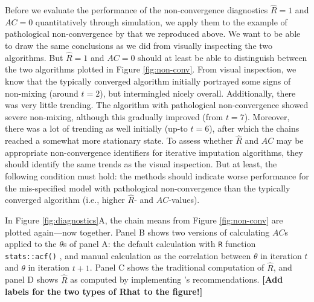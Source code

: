 \documentclass[Royal,times,sageh]{sagej}
\begin{document}
Before we evaluate the performance of the non-convergence diagnostics \(\widehat{R}=1\) and \(AC=0\) quantitatively through simulation, we apply them to the example of pathological non-convergence by \citet{buur18} that we reproduced above. We want to be able to draw the same conclusions as we did from visually inspecting the two algorithms. But \(\widehat{R}=1\) and \(AC=0\) should at least be able to distinguish between the two algorithms plotted in Figure \ref{fig:non-conv}. From visual inspection, we know that the typically converged algorithm initially portrayed some signs of non-mixing (around \(t=2\)), but intermingled nicely overall. Additionally, there was very little trending. The algorithm with pathological non-convergence showed severe non-mixing, although this gradually improved (from \(t=7\)). Moreover, there was a lot of trending as well initially (up-to \(t=6\)), after which the chains reached a somewhat more stationary state. To assess whether \(\widehat{R}\) and \(AC\) may be appropriate non-convergence identifiers for iterative imputation algorithms, they should identify the same trends as the visual inspection. But at least, the following condition must hold: the methods should indicate worse performance for the mis-specified model with pathological non-convergence than the typically converged algorithm (i.e., higher \(\widehat{R}\)- and \(AC\)-values).

In Figure \ref{fig:diagnostics}A, the chain means from Figure \ref{fig:non-conv} are plotted again---now together. Panel B shows two versions of calculating \(AC\)s applied to the \(\theta\)s of panel A: the default calculation with \texttt{R} function \texttt{stats::acf()} \citep{R}, and manual calculation as the correlation between \(\theta\) in iteration \(t\) and \(\theta\) in iteration \(t+1\). Panel C shows the traditional computation of \(\widehat{R}\), and panel D shows \(\widehat{R}\) as computed by implementing \citet{veht19} 's recommendations. \textbf{{[}Add labels for the two types of Rhat to the figure!{]}}
\end{document}
